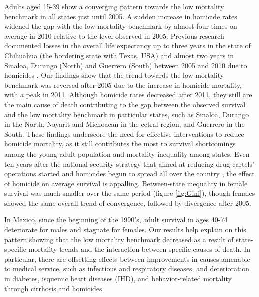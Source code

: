 \documentclass[11.5pt]{article}
\begin{document}
\begin{spacing}{1.5}
Adults aged 15-39 show a converging pattern towards the low mortality benchmark in all states just until 2005. A sudden increase in homicide rates widened the gap with the low mortality benchmark by almost four times on average in 2010 relative to the level observed in 2005. Previous research documented losses in the overall life expectancy up to three years in the state of Chihuahua (the bordering state with Texas, USA) and almost two years in Sinaloa, Durango (North) and Guerrero (South) between 2005 and 2010 due to homicides \citep{Aburto2015}. Our findings show that the trend towards the low mortality benchmark was reversed after 2005 due to the increase in homicide mortality, with a peak in 2011. Although homicide rates decreased after 2011, they still are the main cause of death contributing to the gap between the observed survival and the low mortality benchmark in particular states, such as Sinaloa, Durango in the North, Nayarit and Michoac\'an in the cetral region, and Guerrero in the South. These findings underscore the need for effective interventions to reduce homicide mortality, as it still contributes the most to survival shortcomings among the young-adult population and mortality inequality among states. Even ten years after the national security strategy that aimed at reducing drug cartels' operations started and homicides begun to spread all over the country \citep{espinal2015analysis}, the effect of homicide on average survival is appalling. Between-state inequality in female survival was much smaller over the same period (figure \ref{fig:Gini}), though females showed the same overall trend of convergence, followed by divergence after 2005. 


In Mexico, since the beginning of the 1990's, adult survival in ages 40-74 deteriorate for males and stagnate for females. Our results help explain on this pattern showing that the low mortality benchmark decreased as a result of state-specific mortality trends and the interaction between specific causes of death. In particular, there are offsetting effects between improvements in causes amenable to medical service, such as infectious and respiratory diseases, and deterioration in diabetes, isquemic heart diseases (IHD), and behavior-related mortality through cirrhosis and homicides. 


\end{spacing}
\end{document}
